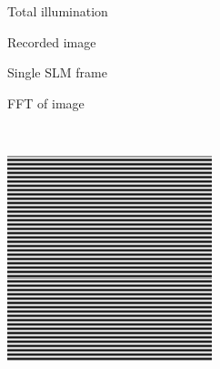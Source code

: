 \begin{figure}[ht!]
  \centering
  \begin{subfigure}[t]{0.23\textwidth}
      \centering
      Total illumination
  \end{subfigure}\hfill
  \begin{subfigure}[t]{0.23\textwidth}
      \centering
      Recorded image
  \end{subfigure}\hfill
  \begin{subfigure}[t]{0.23\textwidth}
      \centering
      Single SLM frame
  \end{subfigure}\hfill
  \begin{subfigure}[t]{0.23\textwidth}
      \centering
      \gls{FFT} of image
  \end{subfigure}\\\vspace{\abovecaptionskip}
  \begin{subfigure}[t]{0.23\textwidth}
      \centering
      \includegraphics[width=\textwidth]{sim_slit/1/vert_pattern}

\end{subfigure}
\end{figure}
